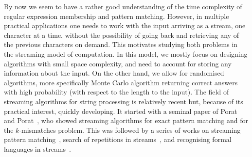 By now we seem to have a rather good understanding of the time complexity of regular expression membership and pattern
matching. However, in multiple practical applications one needs to work with the input arriving as a stream, one character at a time,
without the possibility of going back and retrieving any of the previous characters on demand. This motivates studying
both problems in the streaming model
of computation. In this model, we mostly focus on designing algorithms with small space complexity, and need to account
for storing any information about the input. On the other hand, we allow for randomised algorithms, more specifically
Monte Carlo algorithm returning correct answers with high probability (with respect to the length to the input).
The field of streaming algorithms for string processing is relatively recent but, because of its practical interest, quickly developing.
It started with a seminal paper of  Porat and Porat~\cite{Porat:09}, who showed streaming algorithms for exact pattern matching and for the $k$-mismatches problem. This was followed by a series of works on streaming pattern matching~\cite{DBLP:journals/talg/BreslauerG14,DBLP:conf/esa/CliffordFPSS15,DBLP:conf/esa/GolanP17, DBLP:conf/soda/CliffordFPSS16, starikovskaya:LIPIcs:2017:7320, DBLP:conf/icalp/GolanKP18, gawrychowski_et_al:LIPIcs:2019:10492,clifford2018streaming,DBLP:conf/cpm/GolanKKP20, DBLP:journals/iandc/RadoszewskiS20,DBLP:journals/corr/abs-2106-06037}, search of repetitions in streams~\cite{Ergun:10,stream-periodicity-mismatches, stream-periodicity-wildcards,DBLP:journals/algorithmica/GawrychowskiMSU19, DBLP:conf/cpm/MerkurevS19, DBLP:conf/spire/MerkurevS19, DBLP:conf/cpm/GawrychowskiRS19}, and recognising formal languages in streams~\cite{DBLP:journals/siamcomp/MagniezMN14,ganardi_et_al:LIPIcs:2018:9131, DBLP:conf/lata/GanardiHL18, ganardi_et_al:LIPIcs:2018:8485, ganardi_et_al:LIPIcs:2016:6853, DBLP:conf/mfcs/GanardiJL18, DBLP:journals/tcs/BabuLRV13, franois_et_al:LIPIcs:2016:6355,ganardi_et_al:LIPIcs:2019:11502,bathie_et_al:LIPIcs.ICALP.2021.119}. 

